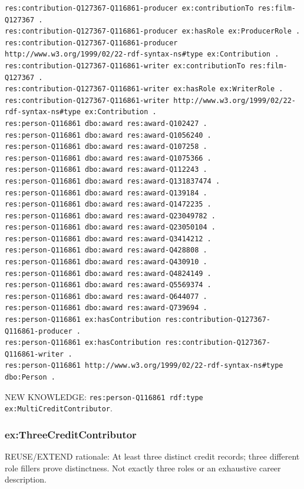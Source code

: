 \documentclass[
  11pt,
]{article}
\begin{document}
\begin{verbatim}
res:contribution-Q127367-Q116861-producer ex:contributionTo res:film-Q127367 .
res:contribution-Q127367-Q116861-producer ex:hasRole ex:ProducerRole .
res:contribution-Q127367-Q116861-producer http://www.w3.org/1999/02/22-rdf-syntax-ns#type ex:Contribution .
res:contribution-Q127367-Q116861-writer ex:contributionTo res:film-Q127367 .
res:contribution-Q127367-Q116861-writer ex:hasRole ex:WriterRole .
res:contribution-Q127367-Q116861-writer http://www.w3.org/1999/02/22-rdf-syntax-ns#type ex:Contribution .
res:person-Q116861 dbo:award res:award-Q102427 .
res:person-Q116861 dbo:award res:award-Q1056240 .
res:person-Q116861 dbo:award res:award-Q107258 .
res:person-Q116861 dbo:award res:award-Q1075366 .
res:person-Q116861 dbo:award res:award-Q112243 .
res:person-Q116861 dbo:award res:award-Q131837474 .
res:person-Q116861 dbo:award res:award-Q139184 .
res:person-Q116861 dbo:award res:award-Q1472235 .
res:person-Q116861 dbo:award res:award-Q23049782 .
res:person-Q116861 dbo:award res:award-Q23050104 .
res:person-Q116861 dbo:award res:award-Q3414212 .
res:person-Q116861 dbo:award res:award-Q428808 .
res:person-Q116861 dbo:award res:award-Q430910 .
res:person-Q116861 dbo:award res:award-Q4824149 .
res:person-Q116861 dbo:award res:award-Q5569374 .
res:person-Q116861 dbo:award res:award-Q644077 .
res:person-Q116861 dbo:award res:award-Q739694 .
res:person-Q116861 ex:hasContribution res:contribution-Q127367-Q116861-producer .
res:person-Q116861 ex:hasContribution res:contribution-Q127367-Q116861-writer .
res:person-Q116861 http://www.w3.org/1999/02/22-rdf-syntax-ns#type dbo:Person .
\end{verbatim}

NEW KNOWLEDGE:
\texttt{res:\allowbreak{}pers\allowbreak{}on-\allowbreak{}\allowbreak{}Q1168\allowbreak{}61 rdf:\allowbreak{}t\allowbreak{}ype ex:\allowbreak{}\allowbreak{}M\allowbreak{}ulti\allowbreak{}Cred\allowbreak{}it\allowbreak{}Contri\allowbreak{}butor}.

\subsubsection{\texorpdfstring{ex:\allowbreak{}\allowbreak{}Three\allowbreak{}\allowbreak{}Credit\allowbreak{}Co\allowbreak{}ntributo\allowbreak{}r}{}}\label{exthreecreditcontributor}

REUSE/EXTEND rationale: At least three distinct credit records; three
different role fillers prove distinct\allowbreak{}ness.\allowbreak{} Not
exactly three roles or an exhaustive career description.
\end{document}
